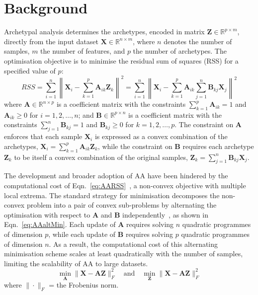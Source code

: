 \documentclass{WileyMSP-template}
\begin{document}
\section{Background}
\label{sec:background}

Archetypal analysis determines the archetypes, encoded in matrix $\mathbf{Z} \in \mathbb{R}^{p \times m}$, directly from the input dataset $\mathbf{X} \in \mathbb{R}^{n \times m}$, where $n$ denotes the number of samples, $m$ the number of features, and $p$ the number of archetypes. The optimisation objective is to minimise the residual sum of squares (RSS) for a specified value of $p$:
\begin{equation} \label{eq:AARSS}
RSS = \sum_{i=1}^n \left\| \mathbf{X}_i - \sum_{k=1}^p \mathbf{A}_{ik} \mathbf{Z}_k \right\|^2 = \sum_{i=1}^n \left\| \mathbf{X}_i - \sum_{k=1}^p \mathbf{A}_{ik} \sum_{j=1}^n \mathbf{B}_{kj} \mathbf{X}_j \right\|^2
\end{equation}
where $\mathbf{A} \in \mathbb{R}^{n \times p}$ is a coefficient matrix with the constraints $\sum_{k=1}^p \mathbf{A}_{ik}=1$ and $\mathbf{A}_{ik} \geq 0$ for $i=1, 2, \ldots, n$; and $\mathbf{B} \in \mathbb{R}^{p \times n}$ is a coefficient matrix with the constraints $\sum_{j=1}^n \mathbf{B}_{kj}=1$ and $\mathbf{B}_{kj} \geq 0$ for $k=1, 2, \ldots, p$. The constraint on $\mathbf{A}$ enforces that each sample $\mathbf{X}_i$ is expressed as a convex combination of the archetypes, $\mathbf{X}_i = \sum^p_{k=1} \mathbf{A}_{ik}\mathbf{Z}_k$, while the constraint on $\mathbf{B}$ requires each archetype $\mathbf{Z}_k$ to be itself a convex combination of the original samples, $\mathbf{Z}_k = \sum^n_{j=1} \mathbf{B}_{kj}\mathbf{X}_j$.

The development and broader adoption of AA have been hindered by the computational cost of Eqn.~\ref{eq:AARSS}~\cite{Chen2014robustAA}, a non-convex objective with multiple local extrema. The standard strategy for minimisation decomposes the non-convex problem into a pair of convex sub-problems by alternating the optimisation with respect to $\mathbf{A}$ and $\mathbf{B}$ independently~\cite{Cutler1994AA}, as shown in Eqn.~\ref{eq:AAaltMin}. Each update of $\mathbf{A}$ requires solving $n$ quadratic programmes of dimension $p$, while each update of $\mathbf{B}$ requires solving $p$ quadratic programmes of dimension $n$. As a result, the computational cost of this alternating minimisation scheme scales at least quadratically with the number of samples, limiting the scalability of AA to large datasets.
\begin{equation} \label{eq:AAaltMin}
\min_{\mathbf{A}} \|\mathbf{X} - \mathbf{A}\mathbf{Z}\|_F^2 \quad \mathrm{and} \quad \min_{\mathbf{Z}} \|\mathbf{X} - \mathbf{A}\mathbf{Z}\|_F^2
\end{equation}
where $\|\cdot\|_F$ = the Frobenius norm.
\end{document}

